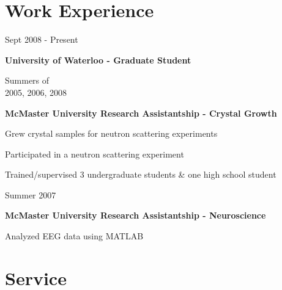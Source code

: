 \documentclass[letterpaper]{article}
\renewenvironment{itemize}{
  \begin{list}{}{
    \setlength{\leftmargin}{1.5em}
  }
}{
  \end{list}
}
\begin{document}
\section*{Work Experience}
\begin{itemize}
\item 
	\begin{minipage}[t]{0.23\linewidth}
 	Sept 2008 - Present 
	\end{minipage}
	\begin{minipage}[t]{0.72\linewidth}
	{\bf University of Waterloo - Graduate Student}
\end{minipage}
\item 
	\begin{minipage}[t]{0.23\linewidth}
 	Summers of\\
	2005, 2006, 2008
	\end{minipage}
	\begin{minipage}[t]{0.77\linewidth}
	{\bf McMaster University Research Assistantship - Crystal Growth}
		\begin{itemize}
		\item Grew crystal samples for neutron scattering experiments
		\item Participated in a neutron scattering experiment
		\item Trained/supervised 3 undergraduate students \& one high school student
		\end{itemize}
\end{minipage}
\item 
	\begin{minipage}[t]{0.23\linewidth}
 	Summer 2007
	\end{minipage}
	\begin{minipage}[t]{0.72\linewidth}
	{\bf McMaster University Research Assistantship - Neuroscience}
		\begin{itemize}
		\item Analyzed EEG data using MATLAB
		\end{itemize}
\end{minipage}
\end{itemize}

\section*{Service}
\end{document}
